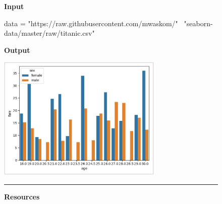 \begin{figure}
\begin{mdframed}[backgroundcolor=gray!05] 
\begin{scriptsize}



\textbf{Input} 


\begin{python}
data = "https://raw.githubusercontent.com/mwaskom/" \
  "seaborn-data/master/raw/titanic.csv"
\end{python}

\textbf{Output}


\begin{center}
  \includegraphics[width=0.7\textwidth]{appendix/cp6/titanic-chart.png}
\end{center}


\begin{center}
\rule{10cm}{0.4pt}
\end{center}
  


\textbf{Resources}


\end{scriptsize}
\end{mdframed}
\end{figure}
